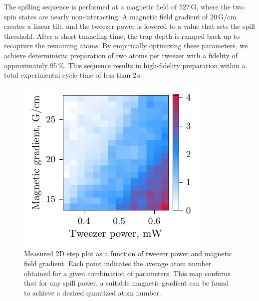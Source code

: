 The spilling sequence is performed at a magnetic field of 527\,G, where the two spin states are nearly non-interacting. A magnetic field gradient of 20\,G/cm creates a linear tilt, and the tweezer power is lowered to a value that sets the spill threshold. After a short tunneling time, the trap depth is ramped back up to recapture the remaining atoms. By empirically optimizing these parameters, we achieve deterministic preparation of two atoms per tweezer with a fidelity of approximately 95\,\%. This sequence results in high-fidelity preparation within a total experimental cycle time of less than 2\,s.








\begin{figure}
    \centering
    \includegraphics{fig-py/step-plot-2d.pdf}
    \caption{
        Measured 2D step plot as a function of tweezer power and magnetic field gradient. Each point indicates the average atom number obtained for a given combination of parameters. This map confirms that for any spill power, a suitable magnetic gradient can be found to achieve a desired quantized atom number.
    }
    \label{fig:spillingadd-2d}
\end{figure}

